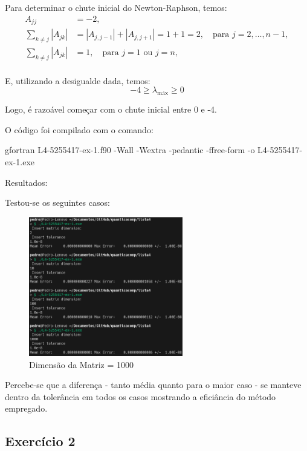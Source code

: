 \documentclass[12pt, a4paper]{article} %
\begin{document}
        Para determinar o chute inicial do Newton-Raphson, temos:
        \begin{align*}
            A_{jj} &= -2, \\
            \sum_{k \ne j} |A_{jk}| &= |A_{j, j-1}| + |A_{j, j+1}| = 1 + 1 = 2, \quad \text{para } j = 2, \ldots, n-1, \\
            \sum_{k \ne j} |A_{jk}| &= 1, \quad \text{para } j = 1 \text{ ou } j = n, \\
        \end{align*}

        E, utilizando a desigualde dada, temos:
        \begin{equation*}
            -4 \geq \lambda_{\text{máx}} \geq 0
        \end{equation*}

        Logo, \'e razoável começar com o chute inicial entre 0 e -4.

        O c\'odigo foi compilado com o comando:

    gfortran L4-5255417-ex-1.f90 -Wall -Wextra -pedantic -ffree-form -o L4-5255417-ex-1.exe  

        Resultados:

        Testou-se os seguintes casos:
        \begin{figure}[H]
            \centering
            \includegraphics[width=0.6\textwidth]{../images/ex1-input.png}
            \caption{Dimens\~ao da Matriz = 1000}
        \end{figure}

        Percebe-se que a diferen\c{c}a - tanto m\'edia quanto para o maior caso - se manteve dentro da toler\^ancia em todos os casos mostrando a efici\^ancia do m\'etodo empregado.

    \subsection{Exerc\'icio 2}
\end{document}
